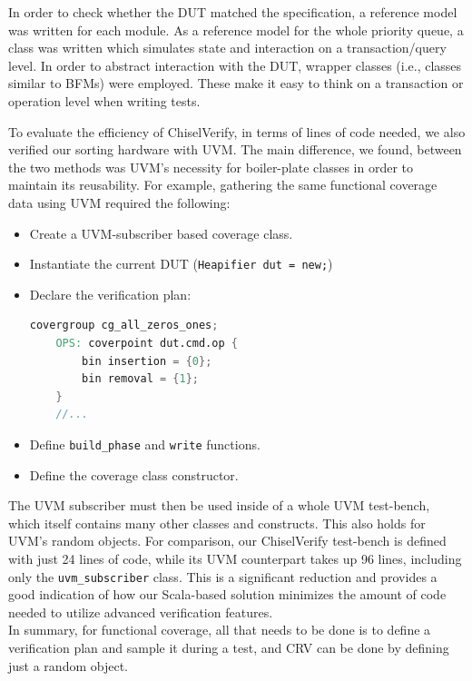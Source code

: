 \documentclass[conference]{IEEEtran}
\begin{document}
In order to check whether the DUT matched the specification, a reference model was written for each module. 
As a reference model for the whole priority queue, a class was written which simulates state and interaction on a transaction/query level. In order to abstract interaction with the DUT, wrapper classes (i.e., classes similar to BFMs) were employed. 
These make it easy to think on a transaction or operation level when writing tests.

To evaluate the efficiency of ChiselVerify, in terms of lines of code needed, we also verified our sorting hardware with UVM.
The main difference, we found, between the two methods was UVM's necessity for boiler-plate classes in order to maintain its reusability.
For example, gathering the same functional coverage data using UVM required the following: 
\begin{itemize}
    \item Create a UVM-subscriber based coverage class.
    \item Instantiate the current DUT (\texttt{Heapifier dut = new;})
    \item Declare the verification plan: 
    \begin{lstlisting}[language=verilog]
	covergroup cg_all_zeros_ones;
	OPS: coverpoint dut.cmd.op {
		bin insertion = {0};
		bin removal = {1};
	}
	//...
    \end{lstlisting}
    \item Define \texttt{build\_phase} and \texttt{write} functions.
    \item Define the coverage class constructor.
\end{itemize}  
The UVM subscriber must then be used inside of a whole UVM test-bench, which itself contains many other classes and constructs.
This also holds for UVM's random objects.
For comparison, our ChiselVerify test-bench is defined with just 24 lines of code,
while its UVM counterpart takes up 96 lines, including only the \texttt{uvm\_subscriber} class.
This is a significant reduction and provides a good indication of how our Scala-based solution minimizes the amount of code needed to utilize advanced verification features. \\
In summary, for functional coverage, all that needs to be done is to define a verification plan and sample it during a test, and
CRV can be done by defining just a random object. 
\end{document}
